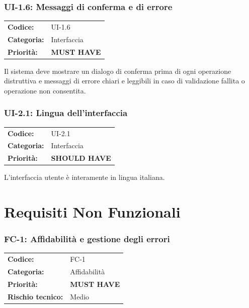 \documentclass[12pt, a4paper]{article}
\newcommand{\MUST}{\colorbox{musthave}{\small\textbf{MUST HAVE}}}
\newcommand{\SHOULD}{\colorbox{shouldhave}{\small\textbf{SHOULD HAVE}}}
\newcommand{\RISKM}{\colorbox{riskmed}{\small Medio}}
\begin{document}
\subsubsection{UI-1.6: Messaggi di conferma e di errore}

\begin{tabular}{@{}ll@{}}
  \toprule
  \textbf{Codice:}    & UI-1.6 \\
  \textbf{Categoria:} & Interfaccia \\
  \textbf{Priorità:}  & \MUST \\
  \bottomrule
\end{tabular}

\medskip
\noindent
Il sistema deve mostrare un dialogo di conferma prima di ogni operazione distruttiva
e messaggi di errore chiari e leggibili in caso di validazione fallita o operazione
non consentita.

\subsubsection{UI-2.1: Lingua dell'interfaccia}

\begin{tabular}{@{}ll@{}}
  \toprule
  \textbf{Codice:}    & UI-2.1 \\
  \textbf{Categoria:} & Interfaccia \\
  \textbf{Priorità:}  & \SHOULD \\
  \bottomrule
\end{tabular}

\medskip
\noindent
L'interfaccia utente è interamente in lingua italiana.

\section{Requisiti Non Funzionali}

\subsubsection{FC-1: Affidabilità e gestione degli errori}

\begin{tabular}{@{}ll@{}}
  \toprule
  \textbf{Codice:}          & FC-1 \\
  \textbf{Categoria:}       & Affidabilità \\
  \textbf{Priorità:}        & \MUST \\
  \textbf{Rischio tecnico:} & \RISKM \\
  \bottomrule
\end{tabular}
\end{document}
